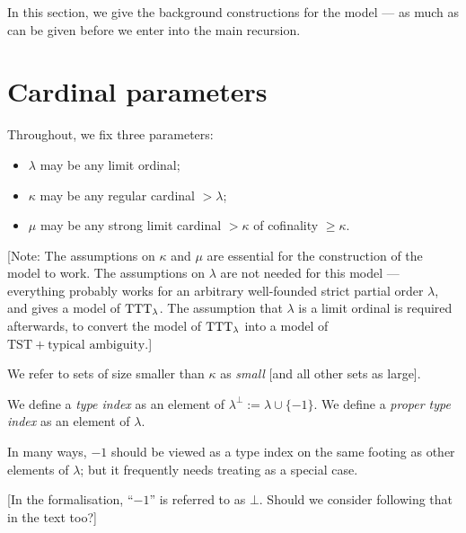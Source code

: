 In this section, we give the background constructions for the model — as much as can be given before we enter into the main recursion.

\section{Cardinal parameters}

\begin{definition}
\label {def:params}
\leanok
{}
Throughout, we fix three parameters:
\begin{itemize}
  \item $\lambda$ may be any limit ordinal;
  \item $\kappa$ may be any regular cardinal $>\lambda$;
  \item $\mu$ may be any strong limit cardinal $>\kappa$ of cofinality $\geq \kappa$.
\end{itemize}

[Note: The assumptions on $\kappa$ and $\mu$ are essential for the construction of the model to work.  The assumptions on $\lambda$ are not needed for this model — everything probably works for an arbitrary well-founded strict partial order $\lambda$, and gives a model of $\mathrm{TTT}_\lambda$. The assumption that $\lambda$ is a limit ordinal is required afterwards, to convert the model of $\mathrm{TTT}_\lambda$ into a model of $\mathrm{TST} + \text{typical ambiguity}$.]
\end{definition}

\begin{definition}
  \label {def:small}
  \leanok
  We refer to sets of size smaller than $\kappa$ as \emph{small} [and all other sets as large].
  \end{definition}

\begin{definition}
\label {def:type-index}
\leanok
{}
We define a {\em type index} as an element of $\lambda^\bot := \lambda \cup \{-1\}$.
We define a {\em proper type index} as an element of $\lambda$.

In many ways, $-1$ should be viewed as a type index on the same footing as other elements of $\lambda$; but it frequently needs treating as a special case.

[In the formalisation, “$-1$” is referred to as $\bot$.  Should we consider following that in the text too?]
\end{definition}

